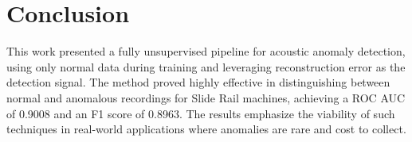 \section{Conclusion}
\label{Sec:Conclusion}

This work presented a fully unsupervised pipeline for acoustic anomaly detection, using only normal data during training and leveraging reconstruction error as the detection signal. The method proved highly effective in distinguishing between normal and anomalous recordings for Slide Rail machines, achieving a ROC AUC of 0.9008 and an F1 score of 0.8963. The results emphasize the viability of such techniques in real-world applications where anomalies are rare and cost to collect. 